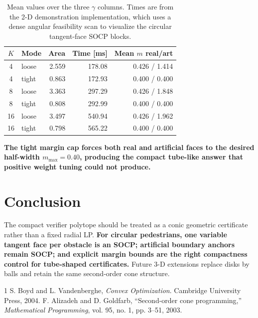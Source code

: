 \documentclass[conference]{IEEEtran}
\begin{document}
\begin{table}[t]
\centering
\caption{Mean values over the three $\gamma$ columns. Times are from the 2-D demonstration implementation, which uses a dense angular feasibility scan to visualize the circular tangent-face SOCP blocks.}
\label{tab:mbounds}
\begin{tabular}{c l r r r}
\toprule
$K$ & Mode & Area & Time [ms] & Mean $m$ real/art \\
\midrule
4  & loose & 2.559 & 178.08 & 0.426 / 1.414 \\
4  & tight & 0.863 & 172.93 & 0.400 / 0.400 \\
8  & loose & 3.363 & 297.29 & 0.426 / 1.848 \\
8  & tight & 0.808 & 292.99 & 0.400 / 0.400 \\
16 & loose & 3.497 & 540.94 & 0.426 / 1.962 \\
16 & tight & 0.798 & 565.22 & 0.400 / 0.400 \\
\bottomrule
\end{tabular}
\end{table}

\textbf{The tight margin cap forces both real and artificial faces to the desired half-width $m_{\max}=0.40$, producing the compact tube-like answer that positive weight tuning could not produce.}

\section{Conclusion}
The compact verifier polytope should be treated as a conic geometric certificate rather than a fixed radial LP.  \textbf{For circular pedestrians, one variable tangent face per obstacle is an SOCP; artificial boundary anchors remain SOCP; and explicit margin bounds are the right compactness control for tube-shaped certificates.} Future 3-D extensions replace disks by balls and retain the same second-order cone structure.

\begin{thebibliography}{1}
S. Boyd and L. Vandenberghe, \emph{Convex Optimization}. Cambridge University Press, 2004.
F. Alizadeh and D. Goldfarb, ``Second-order cone programming,'' \emph{Mathematical Programming}, vol. 95, no. 1, pp. 3--51, 2003.
\end{thebibliography}
\end{document}
